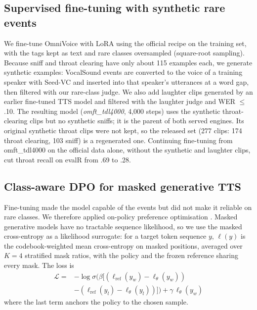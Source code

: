 \documentclass[11pt]{article}
\begin{document}
\subsection{Supervised fine-tuning with synthetic rare events}
We fine-tune OmniVoice with LoRA \citep{hu2022lora} using the official recipe on the training set, with the tags kept
as text and rare classes oversampled (square-root sampling). Because sniff and throat clearing have only about 115
examples each, we generate synthetic examples: VocalSound events are converted to the voice of a training speaker with
Seed-VC \citep{seedvc} and inserted into that speaker's utterances at a word gap, then filtered with our rare-class
judge. We also add laughter clips generated by an earlier fine-tuned TTS model and filtered with the laughter judge and
WER $\le$ .10. The resulting model (\emph{omft\_tdl4000}, 4{,}000 steps) uses the synthetic throat-clearing clips but no
synthetic sniffs; it is the parent of both served engines. Its original synthetic throat clips were not kept, so the
released set (277 clips: 174 throat clearing, 103 sniff) is a regenerated one. Continuing fine-tuning from
omft\_tdl4000 on the official data alone, without the synthetic and laughter clips, cut throat recall on evalR from .69
to .28.

\subsection{Class-aware DPO for masked generative TTS}
\label{sec:dpo}
Fine-tuning made the model capable of the events but did not make it reliable on rare classes. We therefore applied
on-policy preference optimisation \citep{rafailov2023dpo}. Masked generative models have no tractable sequence
likelihood, so we use the masked cross-entropy as a likelihood surrogate: for a target token sequence $y$, $\ell(y)$ is
the codebook-weighted mean cross-entropy on masked positions, averaged over $K{=}4$ stratified mask ratios, with the
policy and the frozen reference sharing every mask. The loss is
\begin{align*}
\mathcal{L} = &-\log\sigma\big(\beta[(\ell_{\mathrm{ref}}(y_w){-}\ell_\theta(y_w)) \\
&- (\ell_{\mathrm{ref}}(y_l){-}\ell_\theta(y_l))]\big) + \gamma\,\ell_\theta(y_w)
\end{align*}
where the last term anchors the policy to the chosen sample.
\end{document}
